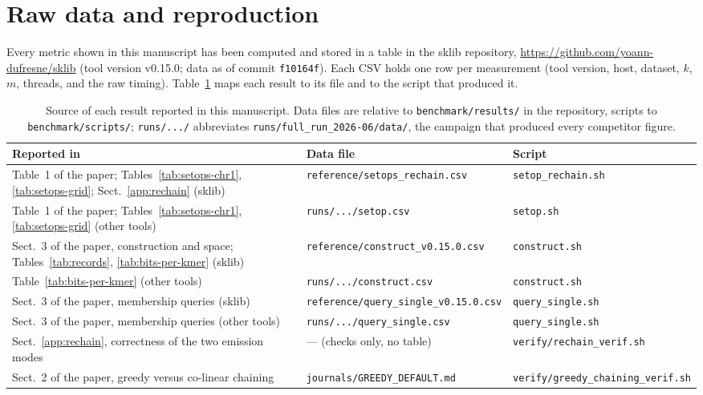 \documentclass[runningheads,a4paper]{llncs}
\newcommand{\sklib}{\textsf{sklib}\xspace}
\newif\ifrevmarkup\revmarkupfalse
\newenvironment{revblock}{\ifrevmarkup\color{blue}\fi}{}
\begin{document}
\begin{revblock}
\section{Raw data and reproduction}
\label{app:data}
Every metric shown in this manuscript has been computed and stored in a table in the \sklib{} repository, \url{https://github.com/yoann-dufresne/sklib} (tool version v0.15.0; data as of commit \texttt{f10164f}). Each CSV holds one row per measurement (tool version, host, dataset, $k$, $m$, threads, and the raw timing). Table~\ref{tab:data} maps each result to its file and to the script that produced it.

\begin{table}[h]
\centering
\caption{Source of each result reported in this manuscript. Data files are relative to \texttt{benchmark/results/} in the repository, scripts to \texttt{benchmark/scripts/}; \texttt{runs/.../} abbreviates \texttt{runs/full\_run\_2026-06/data/}, the campaign that produced every competitor figure.}
\label{tab:data}
\footnotesize
\setlength{\tabcolsep}{3pt}
\renewcommand{\arraystretch}{1.15}
\begin{revblock}
\begin{tabular}{@{}>{\raggedright\arraybackslash}p{3.9cm}>{\raggedright\arraybackslash}p{4.4cm}>{\raggedright\arraybackslash}p{3.4cm}@{}}
\toprule
Reported in & Data file & Script \\
\midrule
Table~1 of the paper; Tables~\ref{tab:setops-chr1}, \ref{tab:setops-grid}; Sect.~\ref{app:rechain} (\sklib)
  & \texttt{reference/\allowbreak setops\_rechain.csv}
  & \texttt{setop\_rechain.sh} \\
Table~1 of the paper; Tables~\ref{tab:setops-chr1}, \ref{tab:setops-grid} (other tools)
  & \texttt{runs/.../setop.csv}
  & \texttt{setop.sh} \\
\addlinespace
Sect.~3 of the paper, construction and space; Tables~\ref{tab:records}, \ref{tab:bits-per-kmer} (\sklib)
  & \texttt{reference/\allowbreak construct\_v0.15.0.csv}
  & \texttt{construct.sh} \\
Table~\ref{tab:bits-per-kmer} (other tools)
  & \texttt{runs/.../construct.csv}
  & \texttt{construct.sh} \\
\addlinespace
Sect.~3 of the paper, membership queries (\sklib)
  & \texttt{reference/\allowbreak query\_single\_v0.15.0.csv}
  & \texttt{query\_single.sh} \\
Sect.~3 of the paper, membership queries (other tools)
  & \texttt{runs/.../\allowbreak query\_single.csv}
  & \texttt{query\_single.sh} \\
\addlinespace
Sect.~\ref{app:rechain}, correctness of the two emission modes
  & --- (checks only, no table)
  & \texttt{verify/\allowbreak rechain\_verif.sh} \\
Sect.~2 of the paper, greedy versus co-linear chaining
  & \texttt{journals/\allowbreak GREEDY\_DEFAULT.md}
  & \texttt{verify/\allowbreak greedy\_\allowbreak chaining\_verif.sh} \\
\bottomrule
\end{tabular}
\end{revblock}
\end{table}


\end{revblock}
\end{document}
